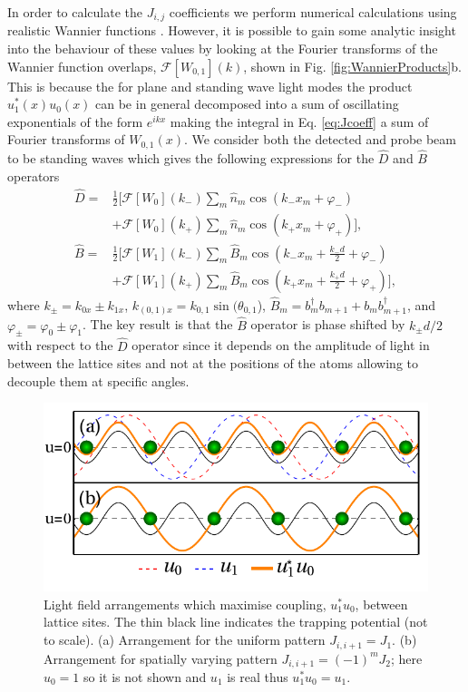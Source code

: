 In order to calculate the $J_{i,j}$ coefficients we perform numerical
calculations using realistic Wannier functions
\cite{walters2013}. However, it is possible to gain some analytic
insight into the behaviour of these values by looking at the Fourier
transforms of the Wannier function overlaps,
$\mathcal{F}[W_{0,1}](k)$, shown in Fig.
\ref{fig:WannierProducts}b. This is because the for plane and standing
wave light modes the product $u_1^*(x) u_0(x)$ can be in general
decomposed into a sum of oscillating exponentials of the form
$e^{i k x}$ making the integral in Eq. \eqref{eq:Jcoeff} a sum of
Fourier transforms of $W_{0,1}(x)$. We consider both the detected and
probe beam to be standing waves which gives the following expressions
for the $\hat{D}$ and $\hat{B}$ operators
\begin{align}
  \label{eq:FTs}
  \hat{D} = & \frac{1}{2}[\mathcal{F}[W_0](k_-)\sum_m\hat{n}_m\cos(k_-
              x_m +\varphi_-) \nonumber\\ 
            & + \mathcal{F}[W_0](k_+)\sum_m\hat{n}_m\cos(k_+ x_m +\varphi_+)],
              \nonumber\\ 
  \hat{B} = & \frac{1}{2}[\mathcal{F}[W_1](k_-)\sum_m\hat{B}_m\cos(k_- x_m
              +\frac{k_-d}{2}+\varphi_-) \nonumber\\ 
            & +\mathcal{F}[W_1](k_+)\sum_m\hat{B}_m\cos(k_+
              x_m +\frac{k_+d}{2}+\varphi_+)],
\end{align}
where $k_\pm = k_{0x} \pm k_{1x}$,
$k_{(0,1)x} = k_{0,1} \sin(\theta_{0,1}$),
$\hat{B}_m=b^\dag_mb_{m+1}+b_mb^\dag_{m+1}$, and
$\varphi_\pm=\varphi_0 \pm \varphi_1$. The key result is that the
$\hat{B}$ operator is phase shifted by $k_\pm d/2$ with respect to the
$\hat{D}$ operator since it depends on the amplitude of light in
between the lattice sites and not at the positions of the atoms
allowing to decouple them at specific angles.

\begin{figure}[hbtp!]
  \centering
  \includegraphics[width=0.8\linewidth]{BDiagram}
  \caption[Maximising Light-Matter Coupling between Lattice
  Sites]{Light field arrangements which maximise coupling, $u_1^*u_0$,
    between lattice sites. The thin black line indicates the trapping
    potential (not to scale). (a) Arrangement for the uniform pattern
    $J_{i,i+1} = J_1$. (b) Arrangement for spatially varying pattern
    $J_{i,i+1}=(-1)^m J_2$; here $u_0=1$ so it is not shown and $u_1$
    is real thus $u_1^*u_0=u_1$. \label{fig:BDiagram}}
\end{figure}

